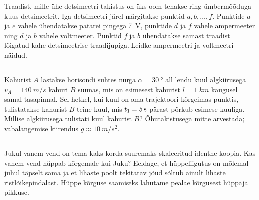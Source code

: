 \documentclass[10pt]{article}
\begin{document}
Traadist, mille ühe detsimeetri takistus on üks oom tehakse ring ümbermõõduga kuus detsimeetrit. Iga detsimeetri järel märgitakse punktid $a, b, \ldots, f$. Punktide $a$ ja $e$ vahele ühendatakse patarei pingega \SI{7}{V}, punktide $d$ ja $f$ vahele ampermeeter ning $d$ ja $b$ vahele voltmeeter. Punktid $f$ ja $b$ ühendatakse samast traadist lõigatud kahe-detsimeetrise traadijupiga. Leidke ampermeetri ja voltmeetri näidud.
\probend
\bigskip
\newpage\subsection{\protect{}}


Kahurist $A$ lastakse horisondi suhtes nurga $\alpha=\SI{30}{\degree}$ all lendu kuul algkiirusega $v_A=\SI{140}{m/s}$ kahuri $B$ suunas, mis on esimesest kahurist $l=\SI{1}{km}$ kaugusel samal tasapinnal. Sel hetkel, kui kuul on oma trajektoori kõrgeimas punktis, tulistatakse kahurist $B$ teine kuul, mis $t_1=\SI 5s$ pärast põrkub  esimese kuuliga. Millise algkiirusega tulistati kuul kahurist $B$? Õhutakistusega mitte arvestada; vabalangemise kiirendus $g\approx\SI{10}{m/s^2}$.
\probend
\bigskip
\newpage\subsection{\protect{}}


Jukul vanem vend on tema kaks korda suuremaks skaleeritud identne koopia. Kas vanem vend hüppab kõrgemale kui Juku? Eeldage, et hüppeliigutus on mõlemal juhul täpselt sama ja et lihaste poolt tekitatav jõud sõltub ainult lihaste ristlõikepindalast. Hüppe kõrguse saamiseks lahutame pealae kõrgusest hüppaja pikkuse.
\probend
\bigskip
\newpage\subsection{\protect{}}

\end{document}
